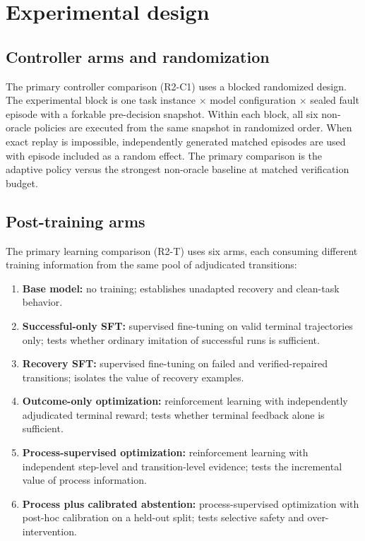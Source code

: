 \section{Experimental design}
\label{sec:experiments}

\subsection{Controller arms and randomization}

The primary controller comparison (R2-C1) uses a blocked randomized design.
The experimental block is one task instance $\times$ model configuration
$\times$ sealed fault episode with a forkable pre-decision snapshot. Within
each block, all six non-oracle policies are executed from the same snapshot
in randomized order. When exact replay is impossible, independently
generated matched episodes are used with episode included as a random
effect. The primary comparison is the adaptive policy versus the strongest
non-oracle baseline at matched verification budget.

\subsection{Post-training arms}

The primary learning comparison (R2-T) uses six arms, each consuming
different training information from the same pool of adjudicated transitions:

\begin{enumerate}
    \item \textbf{Base model:} no training; establishes unadapted recovery
          and clean-task behavior.
    \item \textbf{Successful-only SFT:} supervised fine-tuning on valid
          terminal trajectories only; tests whether ordinary imitation of
          successful runs is sufficient.
    \item \textbf{Recovery SFT:} supervised fine-tuning on failed and
          verified-repaired transitions; isolates the value of recovery
          examples.
    \item \textbf{Outcome-only optimization:} reinforcement learning with
          independently adjudicated terminal reward; tests whether terminal
          feedback alone is sufficient.
    \item \textbf{Process-supervised optimization:} reinforcement learning
          with independent step-level and transition-level evidence;
          tests the incremental value of process information.
    \item \textbf{Process plus calibrated abstention:} process-supervised
          optimization with post-hoc calibration on a held-out split;
          tests selective safety and over-intervention.
\end{enumerate}

